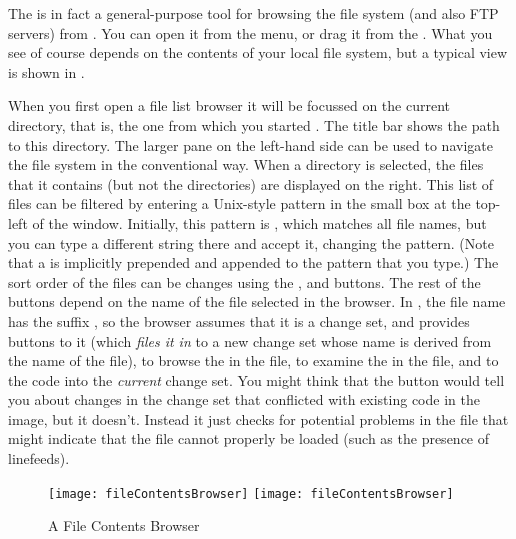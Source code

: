 \documentclass[a4paper,10pt,twoside]{book}
\begin{document}
The  is in fact a general-purpose tool for browsing the file system (and also FTP servers) from \sq. 
You can open it from the  menu, or drag it from the \toolsflapind.
What you see of course depends on the contents of your local file system, but a typical view is shown in .

When you first open a file list browser it will be focussed on the current directory, that is, the one from which you started \sq. The title bar shows the path to this directory.
The larger pane on the left-hand side can be used to navigate the file system in the conventional way.
When a directory is selected, the files that it contains (but not the directories) are displayed on the right.
This list of files can be filtered by entering a Unix-style pattern in the small box at the top-left of the window.  
Initially, this pattern is \ct{*}, which matches all file names, but you can type a different string there and accept it, changing the pattern.  (Note that a \ct{*} is implicitly prepended and appended to the pattern that you type.)
The sort order of the files can be changes using the ,  and  buttons.
The rest of the buttons depend on the name of the file selected in the browser.
In , the file name has the suffix , so the browser assumes that it is a change set, and provides buttons to  it (which \textit{files it in} to a new change set whose name is derived from the name of the file),  to browse the  in the file, to examine the  in the file, 
and to  the code into the \emph{current} change set.
You might think that the  button would tell you about changes in the change set that conflicted with existing code in the image, but it doesn't.
Instead it just checks for potential problems in the file that might indicate that the file cannot properly be loaded (such as the presence of linefeeds).

\begin{figure}[btp]
	\begin{center}
	\ifluluelse
		{\texttt{[image: fileContentsBrowser]}}
		{\texttt{[image: fileContentsBrowser]}}
	\end{center}
	\caption{A File Contents Browser}
	\label{fig:fileContentsBrowser}
\end{figure}
\end{document}
